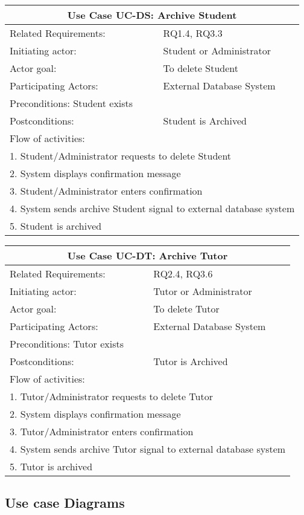 \documentclass[11pt,a4paper]{article}
\begin{document}
{		\begin{tabular}{| l | p{10cm}| }
			\hline\multicolumn{2}{|c|}{ \textbf{Use Case UC-DS: Archive Student}} \\ \hline
			Related Requirements: & RQ1.4, RQ3.3 \\ \hline
			Initiating actor: & Student or Administrator \\ \hline
			Actor goal: & To delete Student\\ \hline
			Participating Actors: & External Database System\\ \hline
			Preconditions: Student exists\\ \hline
			Postconditions: & Student is Archived\\ \hline
			\multicolumn{2}{|l|}{Flow of activities:}\\ \hline
			\multicolumn{2}{|p{15cm}|}{1. Student/Administrator requests to delete Student}\\
			\multicolumn{2}{|p{15cm}|}{2. System displays confirmation message}\\
			\multicolumn{2}{|p{15cm}|}{3. Student/Administrator enters confirmation}	\\		
			\multicolumn{2}{|p{15cm}|}{4. System sends archive Student signal to external database system}\\
			\multicolumn{2}{|l|}{5. Student is archived}	
			\\ \hline		
		\end{tabular}
		
		\begin{tabular}{| l | p{10cm}| }
			\hline\multicolumn{2}{|c|}{ \textbf{Use Case UC-DT: Archive Tutor}} \\ \hline
			Related Requirements: & RQ2.4, RQ3.6 \\ \hline
			Initiating actor: & Tutor or Administrator \\ \hline
			Actor goal: & To delete Tutor\\ \hline
			Participating Actors: & External Database System\\ \hline
			Preconditions: Tutor exists\\ \hline
			Postconditions: & Tutor is Archived\\ \hline
			\multicolumn{2}{|l|}{Flow of activities:}\\ \hline
			\multicolumn{2}{|p{15cm}|}{1. Tutor/Administrator requests to delete Tutor}\\
			\multicolumn{2}{|p{15cm}|}{2. System displays confirmation message}\\
			\multicolumn{2}{|p{15cm}|}{3. Tutor/Administrator enters confirmation}	\\		
			\multicolumn{2}{|p{15cm}|}{4. System sends archive Tutor signal to external database system}\\
			\multicolumn{2}{|l|}{5. Tutor is archived}	
			\\ \hline		
		\end{tabular}		
		
		}
		
		\subsection{Use case Diagrams}
		
		
	
\end{document}
